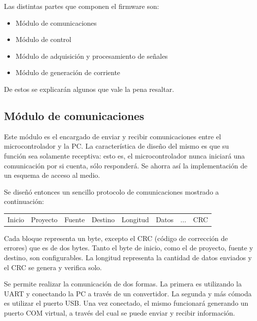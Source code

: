 \documentclass[../et.tex]{subfiles}
\begin{document}
Las distintas partes que componen el firmware son:
  \begin{itemize}
      \item Módulo de comunicaciones
      \item Módulo de control
      \item Módulo de adquisición y procesamiento de señales
      \item Módulo de generación de corriente
  \end{itemize}

De estos se explicarán algunos que vale la pena resaltar.

\subsection{Módulo de comunicaciones}
Este módulo es el encargado de enviar y recibir comunicaciones entre el microcontrolador y la PC. La característica de diseño del mismo es que su función sea solamente receptiva: esto es, el microcontrolador nunca iniciará una comunicación por si cuenta, sólo responderá. Se ahorra así la implementación de un esquema de acceso al medio.

Se diseñó entonces un sencillo protocolo de comunicaciones mostrado a continuación:

\begin{table}[!htbp]
    \centering
    \begin{tabular}{c|c|c|c|c|c|c|c}
    Inicio & Proyecto & Fuente & Destino & Longitud & Datos & $...$ & CRC
    \end{tabular}
\end{table}

Cada bloque representa un byte, excepto el CRC (código de corrección de errores) que es de dos bytes. Tanto el byte de inicio, como el de proyecto, fuente y destino, son configurables. La longitud representa la cantidad de datos enviados y el CRC se genera y verifica solo.

Se permite realizar la comunicación de dos formas. La primera es utilizando la UART y conectando la PC a través de un convertidor. La segunda y más cómoda es utilizar el puerto USB. Una vez conectado, el mismo funcionará generando un puerto COM virtual, a través del cual se puede enviar y recibir información.
\end{document}
